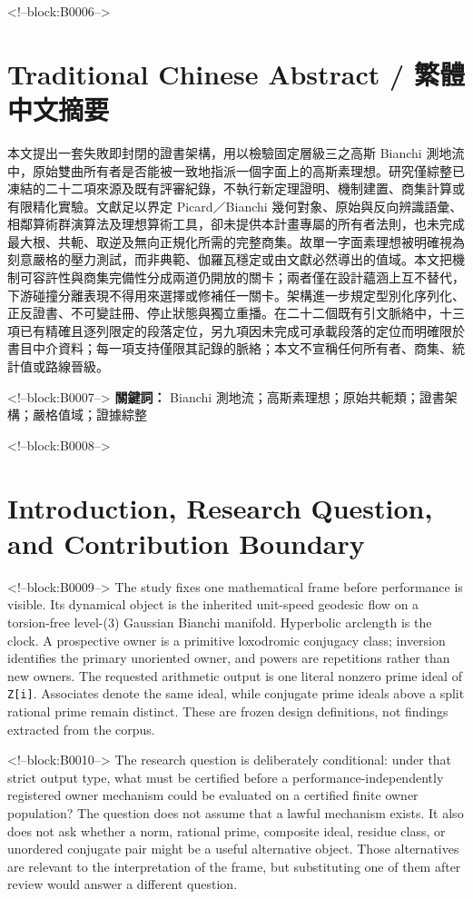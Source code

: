 \documentclass[11pt,a4paper]{article}
\begin{document}
<!--block:B0006-->
\begin{otherlanguage}{chinese-traditional}
\section*{Traditional Chinese Abstract / 繁體中文摘要}
本文提出一套失敗即封閉的證書架構，用以檢驗固定層級三之高斯 Bianchi 測地流中，原始雙曲所有者是否能被一致地指派一個字面上的高斯素理想。研究僅綜整已凍結的二十二項來源及既有評審紀錄，不執行新定理證明、機制建置、商集計算或有限精化實驗。文獻足以界定 Picard／Bianchi 幾何對象、原始與反向辨識語彙、相鄰算術群演算法及理想算術工具，卻未提供本計畫專屬的所有者法則，也未完成最大根、共軛、取逆及無向正規化所需的完整商集。故單一字面素理想被明確視為刻意嚴格的壓力測試，而非典範、伽羅瓦穩定或由文獻必然導出的值域。本文把機制可容許性與商集完備性分成兩道仍開放的關卡；兩者僅在設計蘊涵上互不替代，下游碰撞分離表現不得用來選擇或修補任一關卡。架構進一步規定型別化序列化、正反證書、不可變註冊、停止狀態與獨立重播。在二十二個既有引文脈絡中，十三項已有精確且逐列限定的段落定位，另九項因未完成可承載段落的定位而明確限於書目中介資料；每一項支持僅限其記錄的脈絡；本文不宣稱任何所有者、商集、統計值或路線晉級。

<!--block:B0007-->
\noindent\textbf{關鍵詞：} Bianchi 測地流；高斯素理想；原始共軛類；證書架構；嚴格值域；證據綜整
\end{otherlanguage}

<!--block:B0008-->
\section{Introduction, Research Question, and Contribution Boundary}

<!--block:B0009-->
The study fixes one mathematical frame before performance is visible. Its dynamical object is the inherited unit-speed geodesic flow on a torsion-free level-(3) Gaussian Bianchi manifold. Hyperbolic arclength is the clock. A prospective owner is a primitive loxodromic conjugacy class; inversion identifies the primary unoriented owner, and powers are repetitions rather than new owners. The requested arithmetic output is one literal nonzero prime ideal of \texttt{Z{[}i{]}}. Associates denote the same ideal, while conjugate prime ideals above a split rational prime remain distinct. These are frozen design definitions, not findings extracted from the corpus.

<!--block:B0010-->
The research question is deliberately conditional: under that strict output type, what must be certified before a performance-independently registered owner mechanism could be evaluated on a certified finite owner population? The question does not assume that a lawful mechanism exists. It also does not ask whether a norm, rational prime, composite ideal, residue class, or unordered conjugate pair might be a useful alternative object. Those alternatives are relevant to the interpretation of the frame, but substituting one of them after review would answer a different question.
\end{document}
